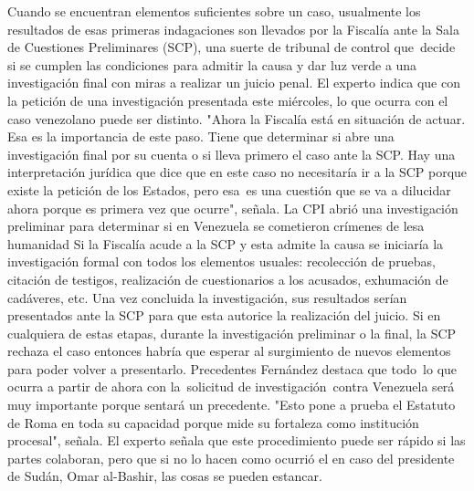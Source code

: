 \documentclass{article}%
\begin{document}
\newline%
%
Cuando se encuentran elementos suficientes sobre un caso, usualmente los resultados de esas primeras indagaciones son llevados por la Fiscalía ante la Sala de Cuestiones Preliminares (SCP), una suerte de tribunal de control que~decide si se cumplen las condiciones para admitir la causa y dar luz verde a una investigación final con miras a realizar un juicio penal.%
\newline%
%
El experto indica que con la petición de una investigación presentada este miércoles, lo que ocurra con el caso venezolano puede ser distinto.%
\newline%
%
"Ahora la Fiscalía está en situación de actuar. Esa es la importancia de este paso. Tiene que determinar si abre una investigación final por su cuenta o si lleva primero el caso ante la SCP. Hay una interpretación jurídica que dice que en este caso no necesitaría ir a la SCP porque existe la petición de los Estados, pero esa~es una cuestión que se va a dilucidar ahora porque es primera vez que ocurre", señala.%
\newline%
%
La CPI abrió una investigación preliminar para determinar si en Venezuela se cometieron crímenes de lesa humanidad%
\newline%
%
Si la Fiscalía acude a la SCP y esta admite la causa se iniciaría la investigación formal con todos los elementos usuales: recolección de pruebas, citación de testigos, realización de cuestionarios a los acusados, exhumación de cadáveres, etc.%
\newline%
%
Una vez concluida la investigación, sus resultados serían presentados ante la SCP para que esta autorice la realización del juicio.%
\newline%
%
Si en cualquiera de estas etapas, durante la investigación preliminar o la final, la SCP rechaza el caso entonces habría que esperar al surgimiento de nuevos elementos para poder volver a presentarlo.%
\newline%
%
Precedentes%
\newline%
%
Fernández destaca que todo~lo que ocurra a partir de ahora con la~solicitud de investigación~contra Venezuela será muy importante porque sentará un precedente.%
\newline%
%
"Esto pone a prueba el Estatuto de Roma en toda su capacidad porque mide su fortaleza como institución procesal", señala.%
\newline%
%
El experto señala que este procedimiento puede ser rápido si las partes colaboran, pero que si no lo hacen como ocurrió el en caso del presidente de Sudán, Omar al{-}Bashir, las cosas se pueden estancar.%
\end{document}
